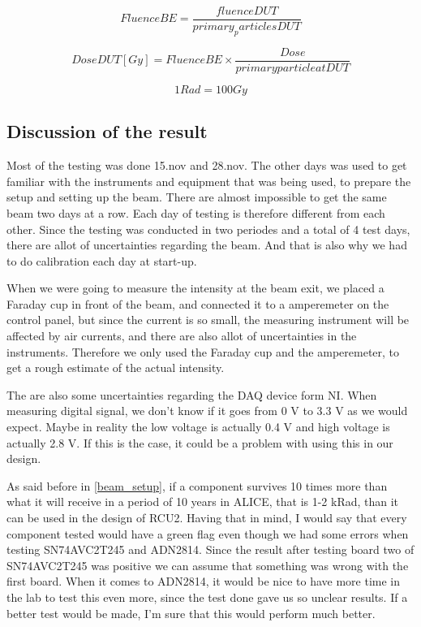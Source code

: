 \documentclass[12pt]{article}
\numberwithin{figure}{section}
\begin{document}
\begin{equation}
FluenceBE = \frac{fluenceDUT}{primary_particlesDUT}
\label{FluenceBE}
\end{equation}

\begin{equation}
DoseDUT[Gy] = FluenceBE \times \frac{Dose}{primary particle at DUT}
\label{DoseDUT}
\end{equation}

\begin{equation}
1 Rad = 100 Gy
\label{Gy_to_Rad}
\end{equation}

\newpage
\subsection{Discussion of the result}
Most of the testing was done 15.nov and 28.nov. The other days was used to get familiar with the instruments and equipment that was being used, to prepare the setup and setting up the beam.
There are almost impossible to get the same beam two days at a row. Each day of testing is therefore different from each other. Since the testing was conducted in two periodes and a total of 4 test days, there are allot of uncertainties regarding the beam.
And that is also why we had to do calibration each day at start-up.

When we were going to measure the intensity at the beam exit, we placed a Faraday cup in front of the beam, and connected it to a amperemeter on the control panel, but since the current is so small, the measuring instrument will be affected by air currents, and there are also allot of uncertainties in the instruments. Therefore we only used the Faraday cup and the amperemeter, to get a rough estimate of the actual intensity.

The are also some uncertainties regarding the DAQ device form NI. When measuring digital signal, we don't know if it goes from 0 V to 3.3 V as we would expect. Maybe in reality the low voltage is actually 0.4 V and high voltage is actually 2.8 V. If this is the case, it could be a problem with using this in our design.

As said before in \ref{beam_setup}, if a component survives 10 times more than what it will receive in a period of 10 years in ALICE, that is 1-2 kRad, than it can be used in the design of RCU2.
Having that in mind, I would say that every component tested would have a green flag even though we had some errors when testing SN74AVC2T245 and ADN2814. Since the result after testing board two of SN74AVC2T245 was positive we can assume that something was wrong with the first board. When it comes to ADN2814, it would be nice to have more time in the lab to test this even more, since the test done gave us so unclear results. If a better test would be made, I'm sure that this would perform much better.
\end{document}
